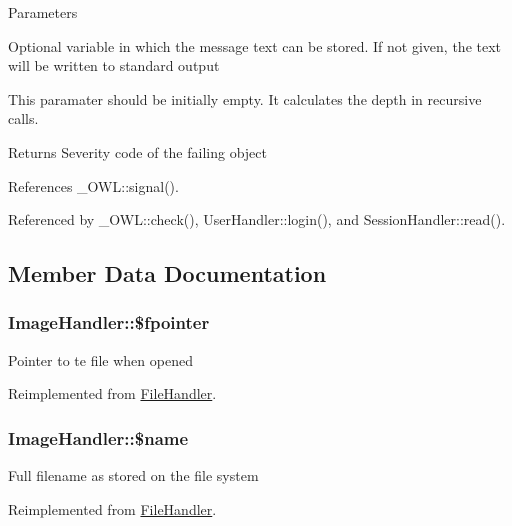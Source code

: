 \begin{DoxyParams}{Parameters}
\item[\mbox{\tt[out]} {\em \$text}]Optional variable in which the message text can be stored. If not given, the text will be written to standard output \item[\mbox{\tt[in]} {\em \$depth}]This paramater should be initially empty. It calculates the depth in recursive calls. \end{DoxyParams}
\begin{DoxyReturn}{Returns}
Severity code of the failing object 
\end{DoxyReturn}


References \_\-OWL::signal().



Referenced by \_\-OWL::check(), UserHandler::login(), and SessionHandler::read().



\subsection{Member Data Documentation}
\subsubsection[{\$fpointer}]{\setlength{\rightskip}{0pt plus 5cm}ImageHandler::\$fpointer}\label{classImageHandler_ac56acda82f7ece75d33f6c57845a727e}
Pointer to te file when opened 

Reimplemented from \hyperlink{classFileHandler_aa0aa66fd3ad551b3f508b901a95c0c2d}{FileHandler}.

\subsubsection[{\$name}]{\setlength{\rightskip}{0pt plus 5cm}ImageHandler::\$name}\label{classImageHandler_a517b3d7ff8643cca1dc2080523bfe2d6}
Full filename as stored on the file system 

Reimplemented from \hyperlink{classFileHandler_a94903bd51b241928ed415ad271c38805}{FileHandler}.



